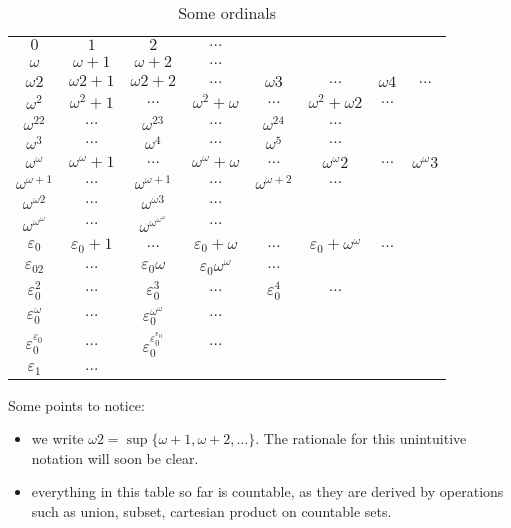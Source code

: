 \documentclass[a4paper]{article}
\begin{document}
{%
  \renewcommand{\arraystretch}{2.5}
\begin{table}[h!]
  \centering
  \begin{tabular}{cccccccc}
    \(0\) & \(1\) & \(2\) & \(\dots\) \\
    \(\omega\) & \(\omega + 1\) & \(\omega + 2\) & \(\dots\) \\
    \(\omega 2\) & \(\omega2 + 1\) & \(\omega2 + 2\) & \(\dots\) & \(\omega3\) & \(\dots\) & \(\omega4\) & \(\dots\) \\
    \(\omega^2\) & \(\omega^2 + 1\) & \(\dots\) & \(\omega^2 + \omega\) & \(\dots\) & \(\omega^2 + \omega2\) & \(\dots\) \\
    \(\omega^22\) & \(\dots\) & \(\omega^23\) & \(\dots\) & \(\omega^24\) & \(\dots\) \\
    \(\omega^3\) & \(\dots\) & \(\omega^4\) & \(\dots\) & \(\omega^5\) & \(\dots\) \\
    \(\omega^\omega\) & \(\omega^\omega + 1\) & \(\dots\) & \(\omega^\omega + \omega\) & \(\dots\) & \(\omega^\omega2\) & \(\dots\) & \(\omega^\omega3\) \\
    \(\omega^{\omega + 1}\) & \(\dots\) & \(\omega^{\omega + 1}\) & \(\dots\) & \(\omega^{\omega + 2}\) & \(\dots\) \\
    \(\omega^{\omega2}\) & \(\dots\) & \(\omega^{\omega 3}\) & \(\dots\) \\
    \(\omega^{\omega^\omega}\) & \(\dots\) & \(\omega^{\omega^{\omega^\omega}}\) & \(\dots\) \\
    \(\varepsilon_0\) & \(\varepsilon_0 + 1\) & \(\dots\) & \(\varepsilon_0 + \omega\) & \(\dots\) & \(\varepsilon_0 + \omega^\omega\) & \(\dots\) \\
    \(\varepsilon_02\) & \(\dots\) & \(\varepsilon_0\omega\) & \(\varepsilon_0\omega^\omega\) & \(\dots\) \\
    \(\varepsilon_0^2\) & \(\dots\) & \(\varepsilon_0^3\) & \(\dots\) & \(\varepsilon_0^4\) & \(\dots\) \\
    \(\varepsilon_0^\omega\) & \(\dots\) & \(\varepsilon_0^{\omega^\omega}\) & \(\dots\) \\
    \(\varepsilon_0^{\varepsilon_0}\) & \(\dots\) & \(\varepsilon_0^{\varepsilon_0^{\varepsilon_0}}\) & \(\dots\) \\
    \(\varepsilon_1\) & \(\dots\)
  \end{tabular}
  \caption{Some ordinals}
  \label{tab:ordinals}
\end{table}
}


Some points to notice:
\begin{itemize}
\item we write \(\omega2 = \sup\{\omega + 1, \omega + 2, \dots\}\). The rationale for this unintuitive notation will soon be clear.
\item everything in this table so far is countable, as they are derived by operations such as union, subset, cartesian product on countable sets.
\end{itemize}
\end{document}
